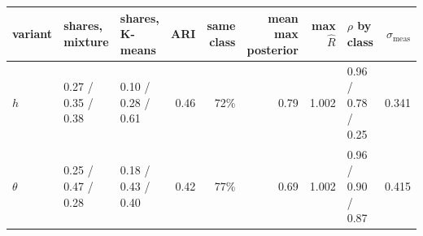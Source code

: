 \begin{tabular}{lllrrrrlr}
\toprule
variant & shares, mixture & shares, K-means & ARI & same class & mean max posterior & max $\hat R$ & $\rho$ by class & $\sigma_{\text{meas}}$ \\
\midrule
$h$ & 0.27 / 0.35 / 0.38 & 0.10 / 0.28 / 0.61 & 0.46 & 72\% & 0.79 & 1.002 & 0.96 / 0.78 / 0.25 & 0.341 \\
$\theta$ & 0.25 / 0.47 / 0.28 & 0.18 / 0.43 / 0.40 & 0.42 & 77\% & 0.69 & 1.002 & 0.96 / 0.90 / 0.87 & 0.415 \\
\bottomrule
\end{tabular}
